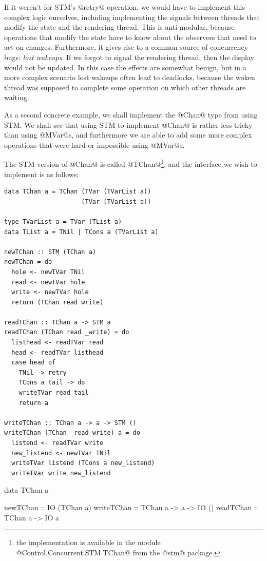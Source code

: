 If it weren't for STM's @retry@ operation, we would have to implement
this complex logic ourselves, including implementing the signals
between threads that modify the state and the rendering thread.  This
is anti-modular, because operations that modify the state have to know
about the observers that need to act on changes.  Furthermore, it
gives rise to a common source of concurrency bugs: \emph{lost
  wakeups}.  If we forgot to signal the rendering thread, then the
display would not be updated.  In this case the effects are somewhat
benign, but in a more complex scenario lost wakeups often lead to
deadlocks, because the woken thread was supposed to complete some
operation on which other threads are waiting.


As a second concrete example, we shall implement the @Chan@ type from
 using STM.  We shall see that using STM to implement
@Chan@ is rather less tricky than using @MVar@s, and furthermore we
are able to add some more complex operations that were hard or
impossible using @MVar@s.

The STM version of @Chan@ is called @TChan@\footnote{the implementation
  is available in the module @Control.Concurrent.STM.TChan@ from the
  @stm@ package.}, and the interface we wish to implement is as
follows:

\begin{lstlisting}[float,label=lst:tchan,caption=implementation of \texttt{TChan},language=HaskellUlisses,style=numbers]
data TChan a = TChan (TVar (TVarList a))
                     (TVar (TVarList a))

type TVarList a = TVar (TList a)
data TList a = TNil | TCons a (TVarList a)

newTChan :: STM (TChan a)
newTChan = do
  hole <- newTVar TNil
  read <- newTVar hole
  write <- newTVar hole
  return (TChan read write)

readTChan :: TChan a -> STM a
readTChan (TChan read _write) = do
  listhead <- readTVar read
  head <- readTVar listhead
  case head of
    TNil -> retry
    TCons a tail -> do
	writeTVar read tail
	return a

writeTChan :: TChan a -> a -> STM ()
writeTChan (TChan _read write) a = do
  listend <- readTVar write
  new_listend <- newTVar TNil
  writeTVar listend (TCons a new_listend)
  writeTVar write new_listend
\end{lstlisting}

\begin{haskell}
data TChan a

newTChan   :: IO (TChan a)
writeTChan :: TChan a -> a -> IO ()
readTChan  :: TChan a -> IO a
\end{haskell}


